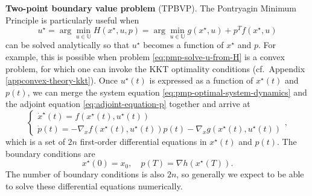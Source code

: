\documentclass[
]{book}
\theoremstyle{definition}
\theoremstyle{definition}
\theoremstyle{definition}
\theoremstyle{definition}
\theoremstyle{remark}
\begin{document}
\textbf{Two-point boundary value problem} (TPBVP). The Pontryagin Minimum Principle is particularly useful when
\begin{equation}
u^\star = \arg\min_{u \in \mathbb{U}} H(x^\star,u,p) = \arg\min_{u \in \mathbb{U}} g(x^\star,u) + p^T f(x^\star,u)
\label{eq:pmp-solve-u-from-H}
\end{equation}
can be solved analytically so that \(u^\star\) becomes a function of \(x^\star\) and \(p\). For example, this is possible when problem \eqref{eq:pmp-solve-u-from-H} is a convex problem, for which one can invoke the KKT optimality conditions (cf.~Appendix \ref{appconvex-theory-kkt}). Once \(u^\star(t)\) is expressed as a function of \(x^\star(t)\) and \(p(t)\), we can merge the system equation \eqref{eq:pmp-optimal-system-dynamics} and the adjoint equation \eqref{eq:adjoint-equation-p} together and arrive at
\begin{equation}
\begin{cases}
\dot{x}^\star(t) = f(x^\star(t), u^\star(t)) \\
\dot{p}(t) = - \nabla_x f(x^\star(t),u^\star(t)) p(t) - \nabla_x g(x^\star(t),u^\star(t))
\end{cases},
\label{eq:two-point-boundary-problem}
\end{equation}
which is a set of \(2n\) first-order differential equations in \(x^\star(t)\) and \(p(t)\). The boundary conditions are
\begin{equation}
x^\star(0) = x_0, \quad p(T) = \nabla h(x^\star(T)).
\label{eq:two-point-boundary-problem-boundary}
\end{equation}
The number of boundary conditions is also \(2n\), so generally we expect to be able to solve these differential equations numerically.
\end{document}
